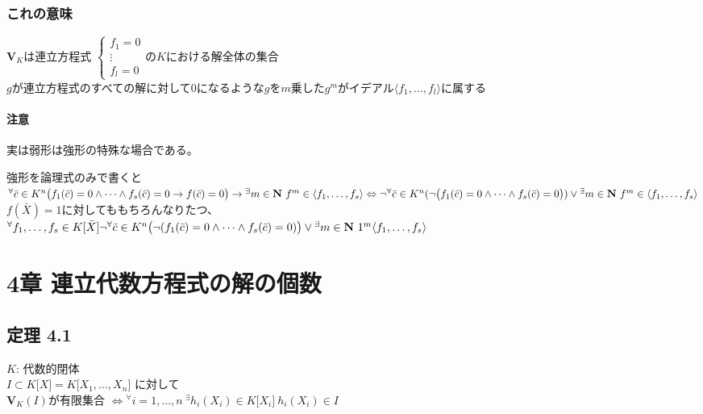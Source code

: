 \documentclass[12pt,a4paper]{article}
\begin{document}
  \subsubsection*{これの意味}
    $\mathbf{V}_K$は連立方程式
    $\begin{cases}
      f_1 = 0 \\
      \vdots \\
      f_l = 0
    \end{cases}$の$K$における解全体の集合 \\
    $g$が連立方程式のすべての解に対して$0$になるような$g$を$m$乗した$g^m$がイデアル$\langle f_1, \ldots, f_l \rangle$に属する

  \paragraph{注意}
    実は弱形は強形の特殊な場合である。

    強形を論理式のみで書くと\\
    ${}^\forall \bar{c} \in K^n \big( f_1  (\bar{c}) = 0 \wedge \cdots \wedge f_s(\bar{c}) = 0 \rightarrow f(\bar{c}) = 0\big) \rightarrow {}^\exists m \in \mathbf{N} \ f^m \in \langle f_1, \ldots , f_s \rangle \\
    \Leftrightarrow \\
    \lnot {}^\forall \bar{c} \in K^n ( \lnot \big(f_1(\bar{c}) = 0 \wedge \cdots \wedge f_s(\bar{c}) = 0\big) )\vee {}^\exists m \in \mathbf{N} \ f^m \in \langle f_1, \ldots, f_s \rangle$ \\
    $f(\bar{X})=1$に対してももちろんなりたつ、\\
    ${}^\forall f_1, \ldots, f_s \in K \lbrack \bar{X} \rbrack \\
    \lnot {}^\forall \bar{c} \in K^n \big(\lnot (f_1 (\bar{c}) = 0 \wedge \cdots \wedge f_s(\bar{c}) = 0)\big) \vee {}^\exists m \in \mathbf{N} \ 1^m \langle f_1, \ldots, f_s \rangle $

\section*{4章 連立代数方程式の解の個数}
\subsection*{定理 4.1}
  $K$: 代数的閉体 \\
  $I \subset K \lbrack X \rbrack = K \lbrack X_1, \ldots, X_n \rbrack$ に対して\\
  $\mathbf{V}_K (I)$が有限集合 $\Leftrightarrow {}^\forall  i = 1 , \ldots , n \ {}^\exists h_i (X_i) \in K \lbrack X_i \rbrack \ h_i (X_i) \in I$
\end{document}
